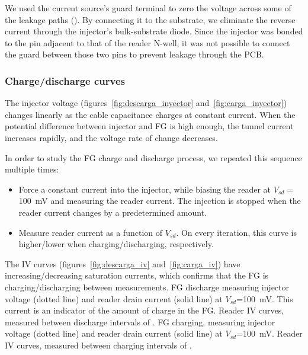 We used the current source's guard terminal to zero the voltage across some of the leakage paths
().
By connecting it to the substrate,
we eliminate the reverse current through the injector's bulk-substrate diode.
Since the injector was bonded to the pin adjacent to that of the reader N-well,
it was not possible to connect the guard between those two pins 
to prevent leakage through the PCB.
\subsubsection{Charge/discharge curves}
The injector voltage (figures~\ref{fig:descarga_inyector}
and~\ref{fig:carga_inyector})
changes linearly as the cable capacitance charges at constant current.
When the potential difference between injector and FG is high enough,
the tunnel current increases rapidly, and the voltage rate of change decreases.

In order to study the FG charge and discharge process,
we repeated this sequence multiple times:
\begin{itemize}
    \item Force a constant current into the injector,
        while biasing the reader at $V_{sd}=$\SI{100}{\milli\volt}
        and measuring the reader current.
        The injection is stopped when the reader current changes by a predetermined amount.
    \item Measure reader current as a function of $V_{sd}$.
        On every iteration, this curve is higher/lower when charging/discharging, respectively.
\end{itemize}

The IV curves (figures~\ref{fig:descarga_iv}
and~\ref{fig:carga_iv}) have increasing/decreasing saturation currents,
which confirms that the FG is charging/discharging
between measurements.
{FG discharge measuring injector voltage (dotted line) and
reader drain current (solid line) at
$V_{sd}$=\SI{100}{\milli\volt}.
This current is an indicator of the amount of charge in the FG.}
{Reader IV curves, measured between discharge intervals of
    .}
{FG charging, measuring injector voltage (dotted line) and
reader drain current (solid line) at
$V_{sd}$=\SI{100}{\milli\volt}.}
{Reader IV curves, measured between charging intervals of
    .}
